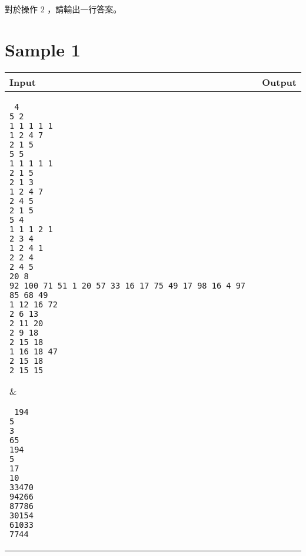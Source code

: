 \documentclass[11pt,a4paper]{article}
\begin{document}
對於操作 $2$ ，請輸出一行答案。

\newpage
\section*{Sample 1}
\begin{longtable}[!h]{|p{}|p{}|}
\hline
\textbf {Input}	& \textbf {Output} \\
\hline
\parbox[t]{0.5\textwidth} %
{ \tt
4\\
5 2\\
1 1 1 1 1\\
1 2 4 7\\
2 1 5\\
5 5\\
1 1 1 1 1\\
2 1 5\\
2 1 3\\
1 2 4 7\\
2 4 5\\
2 1 5\\
5 4\\
1 1 1 2 1\\
2 3 4\\
1 2 4 1\\
2 2 4\\
2 4 5\\
20 8\\
92 100 71 51 1 20 57 33 16 17 75 49 17 98 16 4 97 85 68 49\\
1 12 16 72\\
2 6 13\\
2 11 20\\
2 9 18\\
2 15 18\\
1 16 18 47\\
2 15 18\\
2 15 15\\
} &
\parbox[t]{0.5\textwidth}
{ \tt
194\\
5\\
3\\
65\\
194\\
5\\
17\\
10\\
33470\\
94266\\
87786\\
30154\\
61033\\
7744\\
} \\
\hline
\end{longtable}
\end{document}
